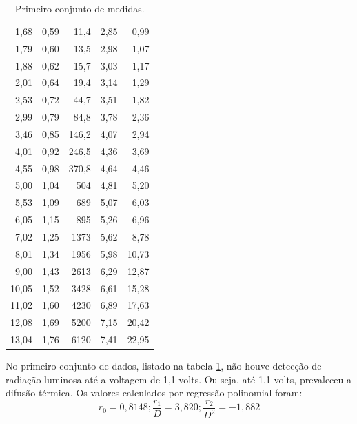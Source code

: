 \documentclass[brazilian,12pt,a4paper,final]{article}
\begin{document}
\begin{table}[htbp!]
\begin{tabular}{|r|r|r|r|r|}
1,68    &       0,59    &       11,4    &       2,85    &       0,99    \\
1,79    &       0,60    &       13,5    &       2,98    &       1,07    \\
1,88    &       0,62    &       15,7    &       3,03    &       1,17    \\
2,01    &       0,64    &       19,4    &       3,14    &       1,29    \\
2,53    &       0,72    &       44,7    &       3,51    &       1,82    \\
2,99    &       0,79    &       84,8    &       3,78    &       2,36    \\
3,46    &       0,85    &       146,2   &       4,07    &       2,94    \\
4,01    &       0,92    &       246,5   &       4,36    &       3,69    \\
4,55    &       0,98    &       370,8   &       4,64    &       4,46    \\
5,00    &       1,04    &       504     &       4,81    &       5,20    \\
5,53    &       1,09    &       689     &       5,07    &       6,03    \\
6,05    &       1,15    &       895     &       5,26    &       6,96    \\
7,02    &       1,25    &       1373    &       5,62    &       8,78    \\
8,01    &       1,34    &       1956    &       5,98    &       10,73   \\
9,00    &       1,43    &       2613    &       6,29    &       12,87   \\
10,05   &       1,52    &       3428    &       6,61    &       15,28   \\
11,02   &       1,60    &       4230    &       6,89    &       17,63   \\
12,08   &       1,69    &       5200    &       7,15    &       20,42   \\
13,04   &       1,76    &       6120    &       7,41    &       22,95   \\
 \hline
 \end{tabular}
 \caption{Primeiro conjunto de medidas.}
 \label{tabdados1}
\end{table}

No primeiro conjunto de dados, listado na tabela \ref{tabdados1}, 
não houve detecção de radiação luminosa até a voltagem de 1,1 volts.
Ou seja, até 1,1 volts, prevaleceu a difusão térmica.
Os valores calculados por regressão polinomial foram:
$$r_0=0,8148; \frac{r_1}{D}=3,820; \frac{r_2}{D^2}=-1,882$$
\end{document}
